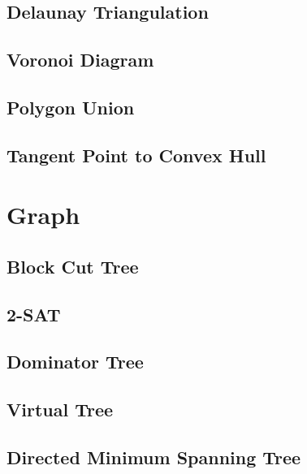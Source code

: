 \documentclass{article}
\begin{document}
\subsection{Delaunay Triangulation}


\subsection{Voronoi Diagram}


\subsection{Polygon Union}


\subsection{Tangent Point to Convex Hull}


\section{Graph}

\subsection{Block Cut Tree}


\subsection{2-SAT}


\subsection{Dominator Tree}


\subsection{Virtual Tree}


\subsection{Directed Minimum Spanning Tree}

\end{document}
